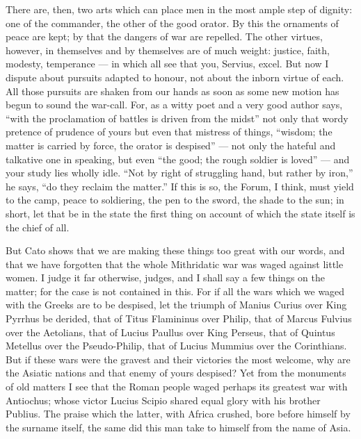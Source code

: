  There are, then, two arts which can place men in the most ample step of dignity: one of the commander, the other of the good orator. By this the ornaments of peace are kept; by that the dangers of war are repelled. The other virtues, however, in themselves and by themselves are of much weight: justice, faith, modesty, temperance --- in which all see that you, Servius, excel. But now I dispute about pursuits adapted to honour, not about the inborn virtue of each. All those pursuits are shaken from our hands as soon as some new motion has begun to sound the war-call. For, as a witty poet and a very good author says, ``with the proclamation of battles is driven from the midst'' not only that wordy pretence of prudence of yours but even that mistress of things, ``wisdom; the matter is carried by force, the orator is despised'' --- not only the hateful and talkative one in speaking, but even ``the good; the rough soldier is loved'' --- and your study lies wholly idle. ``Not by right of struggling hand, but rather by iron,'' he says, ``do they reclaim the matter.'' If this is so, the Forum, I think, must yield to the camp, peace to soldiering, the pen to the sword, the shade to the sun; in short, let that be in the state the first thing on account of which the state itself is the chief of all.

 But Cato shows that we are making these things too great with our words, and that we have forgotten that the whole Mithridatic war was waged against little women. I judge it far otherwise, judges, and I shall say a few things on the matter; for the case is not contained in this. For if all the wars which we waged with the Greeks are to be despised, let the triumph of Manius Curius over King Pyrrhus be derided, that of Titus Flamininus over Philip, that of Marcus Fulvius over the Aetolians, that of Lucius Paullus over King Perseus, that of Quintus Metellus over the Pseudo-Philip, that of Lucius Mummius over the Corinthians. But if these wars were the gravest and their victories the most welcome, why are the Asiatic nations and that enemy of yours despised? Yet from the monuments of old matters I see that the Roman people waged perhaps its greatest war with Antiochus; whose victor Lucius Scipio shared equal glory with his brother Publius. The praise which the latter, with Africa crushed, bore before himself by the surname itself, the same did this man take to himself from the name of Asia.

